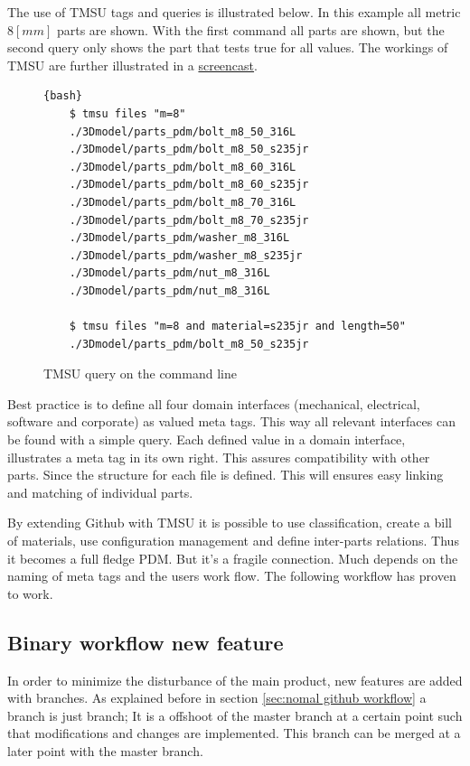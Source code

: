 \documentclass[fleqn,10pt]{SelfArx} %
\begin{document}
The use of TMSU tags and queries is illustrated below. In this example all metric $ 8[mm] $ parts are shown. With the first command all parts are shown, but the second query only shows the part that tests true for all values. The workings of TMSU are further illustrated in a \href{https://youtu.be/bvwW0buxSD4}{\color{color1}screencast}.

\begin{figure}[!hb]
	\begin{lstlisting}{bash}
	$ tmsu files "m=8"
	./3Dmodel/parts_pdm/bolt_m8_50_316L
	./3Dmodel/parts_pdm/bolt_m8_50_s235jr
	./3Dmodel/parts_pdm/bolt_m8_60_316L
	./3Dmodel/parts_pdm/bolt_m8_60_s235jr
	./3Dmodel/parts_pdm/bolt_m8_70_316L
	./3Dmodel/parts_pdm/bolt_m8_70_s235jr
	./3Dmodel/parts_pdm/washer_m8_316L
	./3Dmodel/parts_pdm/washer_m8_s235jr
	./3Dmodel/parts_pdm/nut_m8_316L
	./3Dmodel/parts_pdm/nut_m8_316L
	
	$ tmsu files "m=8 and material=s235jr and length=50"
	./3Dmodel/parts_pdm/bolt_m8_50_s235jr
	\end{lstlisting}
	\caption{TMSU query on the command line}
\end{figure}


Best practice is to define all four domain interfaces (mechanical, electrical, software and corporate) as valued meta tags. This way all relevant interfaces can be found with a simple query. Each defined value in a domain interface, illustrates a meta tag in its own right. This assures compatibility with other parts. Since the structure for each file is defined. This will ensures easy linking and matching of individual parts.

By extending Github with TMSU it is possible to use classification, create a bill of materials, use configuration management and define inter-parts relations. Thus it becomes a full fledge PDM. But it's a fragile connection. Much depends on the naming of meta tags and the users work flow. The following workflow has proven to work.

\subsection{Binary workflow new feature}
In order to minimize the disturbance of the main product, new features are added with branches. As explained before in section \ref{sec:nomal github workflow} a branch is just branch; It is a offshoot of the master branch at a certain point such that modifications and changes are implemented. This branch can be merged at a later point with the master branch. 
\end{document}
